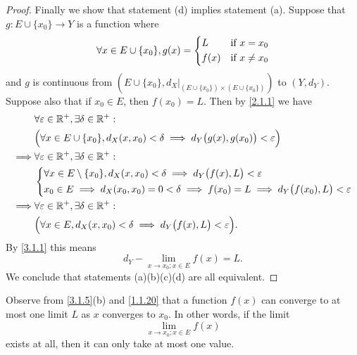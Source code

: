 \begin{proof}
  Finally we show that statement (d) implies statement (a).
  Suppose that \(g : E \cup \{x_0\} \to Y\) is a function where
  \[
    \forall x \in E \cup \{x_0\}, g(x) = \begin{dcases}
      L    & \text{if } x = x_0    \\
      f(x) & \text{if } x \neq x_0
    \end{dcases}
  \]
  and \(g\) is continuous from \((E \cup \{x_0\}, d_X|_{(E \cup \{x_0\}) \times (E \cup \{x_0\})})\) to \((Y, d_Y)\).
  Suppose also that if \(x_0 \in E\), then \(f(x_0) = L\).
  Then by \cref{2.1.1} we have
  \begin{align*}
             & \forall \varepsilon \in \mathbb{R}^+, \exists \delta \in \mathbb{R}^+ :                                                        \\
             & \Big(\forall x \in E \cup \{x_0\}, d_X(x, x_0) < \delta \implies d_Y\big(g(x), g(x_0)\big) < \varepsilon\Big)  \\
    \implies & \forall \varepsilon \in \mathbb{R}^+, \exists \delta \in \mathbb{R}^+ :                                                        \\
             & \begin{dcases}
                 \forall x \in E \setminus \{x_0\}, d_X(x, x_0) < \delta \implies d_Y\big(f(x), L\big) < \varepsilon \\
                 x_0 \in E \implies d_X(x_0, x_0) = 0 < \delta \implies f(x_0) = L \implies d_Y\big(f(x_0), L\big) < \varepsilon
               \end{dcases} \\
    \implies & \forall \varepsilon \in \mathbb{R}^+, \exists \delta \in \mathbb{R}^+ :                                                        \\
             & \Big(\forall x \in E, d_X(x, x_0) < \delta \implies d_Y\big(f(x), L\big) < \varepsilon\Big).
  \end{align*}
  By \cref{3.1.1} this means
  \[
    d_Y - \lim_{x \to x_0 ; x \in E} f(x) = L.
  \]
  We conclude that statements (a)(b)(c)(d) are all equivalent.
\end{proof}

\begin{rmk}\label{3.1.6}
  Observe from \cref{3.1.5}(b) and \cref{1.1.20} that a function \(f(x)\) can converge to at most one limit \(L\) as \(x\) converges to \(x_0\).
  In other words, if the limit
  \[
    \lim_{x \to x_0 ; x \in E} f(x)
  \]
  exists at all, then it can only take at most one value.
\end{rmk}

